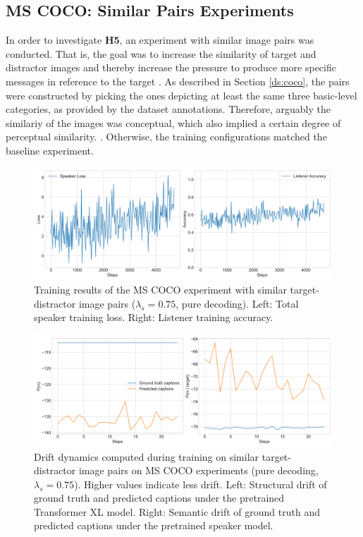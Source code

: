 \subsection{MS COCO: Similar Pairs Experiments}
In order to investigate \textbf{H5}, an experiment with similar image pairs was conducted. That is, the goal was to increase the similarity of target and distractor images and thereby increase the pressure to produce more specific messages in reference to the target \parencite[cf.][]{graf2016animal}. As described in Section \ref{ds:coco}, the pairs were constructed by picking the ones depicting at least the same three basic-level categories, as provided by the dataset annotations. Therefore, arguably the similariy of the images was conceptual, which also implied a certain degree of perceptual similarity. . 
Otherwise, the training configurations matched the baseline experiment. 

\begin{figure}[h]
	\centering
	\includegraphics[width=\linewidth]{images/coco_similarFixed_075_losses.png}
	\caption{Training results of the MS COCO experiment with similar target-distractor image pairs ($\lambda_s=0.75$, pure decoding). Left: Total speaker training loss. Right: Listener training accuracy.}
	\label{fig:coco_similar_speaker_loss_listener_acc_all}
\end{figure}

\begin{figure}[h]
	\centering
	\includegraphics[width=\linewidth]{images/coco_structural_semantic_drift_4000_pure_075_similarFixed.png}
	\caption{Drift dynamics computed during training on similar target-distractor image pairs on MS COCO experiments (pure decoding, $\lambda_s=0.75$). Higher values indicate less drift. Left: Structural drift of ground truth and predicted captions under the pretrained Transformer XL model. Right: Semantic drift of ground truth and predicted captions under the pretrained speaker model.}
	\label{fig:coco_similar_str_sem_drift_all}
\end{figure}

